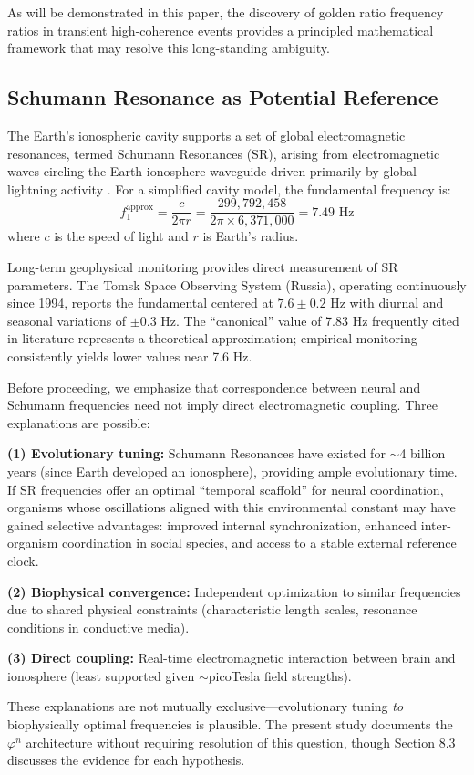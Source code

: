 \documentclass[11pt,a4paper]{article}
\newcommand{\phisym}{\varphi}
\begin{document}
As will be demonstrated in this paper, the discovery of golden ratio frequency ratios in transient high-coherence events provides a principled mathematical framework that may resolve this long-standing ambiguity.

\subsection{Schumann Resonance as Potential Reference}

The Earth's ionospheric cavity supports a set of global electromagnetic resonances, termed Schumann Resonances (SR), arising from electromagnetic waves circling the Earth-ionosphere waveguide driven primarily by global lightning activity \parencite{schumann1952strahlungslosen, nickolaenko2014schumann}. For a simplified cavity model, the fundamental frequency is:
\begin{equation}
f_1^{\text{approx}} = \frac{c}{2\pi r} = \frac{299,792,458}{2\pi \times 6,371,000} = 7.49 \text{ Hz}
\end{equation}
where $c$ is the speed of light and $r$ is Earth's radius.

Long-term geophysical monitoring provides direct measurement of SR parameters. The Tomsk Space Observing System (Russia), operating continuously since 1994, reports the fundamental centered at $7.6 \pm 0.2$ Hz with diurnal and seasonal variations of $\pm 0.3$ Hz. The ``canonical'' value of 7.83 Hz frequently cited in literature represents a theoretical approximation; empirical monitoring consistently yields lower values near 7.6 Hz.

\begin{criticalpoint}
Before proceeding, we emphasize that correspondence between neural and Schumann frequencies need not imply direct electromagnetic coupling. Three explanations are possible:

\textbf{(1) Evolutionary tuning:} Schumann Resonances have existed for $\sim$4 billion years (since Earth developed an ionosphere), providing ample evolutionary time. If SR frequencies offer an optimal ``temporal scaffold'' for neural coordination, organisms whose oscillations aligned with this environmental constant may have gained selective advantages: improved internal synchronization, enhanced inter-organism coordination in social species, and access to a stable external reference clock.

\textbf{(2) Biophysical convergence:} Independent optimization to similar frequencies due to shared physical constraints (characteristic length scales, resonance conditions in conductive media).

\textbf{(3) Direct coupling:} Real-time electromagnetic interaction between brain and ionosphere (least supported given $\sim$picoTesla field strengths).

These explanations are not mutually exclusive---evolutionary tuning \textit{to} biophysically optimal frequencies is plausible. The present study documents the $\phisym^n$ architecture without requiring resolution of this question, though Section 8.3 discusses the evidence for each hypothesis.
\end{criticalpoint}
\end{document}
